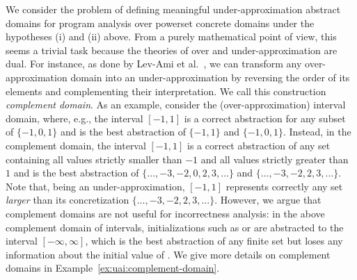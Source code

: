 We consider the problem of defining meaningful under-approximation abstract domains for program analysis over powerset concrete domains under the hypotheses (i) and (ii) above.
%			
%			
From a purely mathematical point of view, this seems a trivial task because the theories of over and under-approximation are dual.
For instance, as done by Lev-Ami et al.~\cite{LSRG07}, we can transform any over-approximation domain into an under-approximation by reversing the order of its elements and complementing their interpretation. We call this construction \emph{complement domain}.
As an example, consider the (over-approximation) interval domain, where, e.g., the interval $[-1,1]$ is a correct abstraction for any subset of $\{ -1, 0, 1 \}$ and is the best abstraction of $\{ -1, 1 \}$ and $\{ -1, 0, 1 \}$. Instead, in the complement domain, the interval $[-1,1]$ is a correct abstraction of any set containing all values strictly smaller than $-1$ and all values strictly greater than $1$ and is the best abstraction of $\{ \dots, -3, -2, 0, 2, 3, \dots \}$ and $\{ \dots, -3, -2, 2, 3, \dots \}$. Note that, being an under-approximation, $[-1, 1]$ represents correctly any set \emph{larger} than its concretization $\{ \dots, -3, -2, 2, 3, \dots \}$.
However, we argue that complement domains are not useful for incorrectness analysis: in the above complement domain of intervals, initializations such as  or  are abstracted to the interval $[-\infty,\infty]$, which is the best abstraction of any finite set but loses any information about the initial value of . We give more details on complement domains in Example~\ref{ex:uai:complement-domain}.


